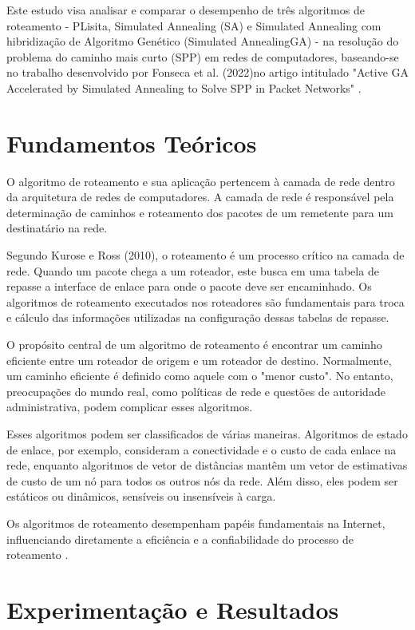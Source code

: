 \documentclass[conference]{IEEEtran}
\begin{document}
Este estudo visa analisar e comparar o desempenho de três algoritmos de roteamento - PLisita, Simulated Annealing (SA) e Simulated Annealing com hibridização de Algoritmo Genético (Simulated AnnealingGA) - na resolução do problema do caminho mais curto (SPP) em redes de computadores, baseando-se no trabalho desenvolvido por Fonseca et al. (2022)no artigo intitulado "Active GA Accelerated by Simulated Annealing to Solve SPP in Packet Networks" \cite{OL2ARouter}.

\section{Fundamentos Teóricos}

O algoritmo de roteamento e sua aplicação pertencem à camada de rede dentro da arquitetura de redes de computadores. A camada de rede é responsável pela determinação de caminhos e roteamento dos pacotes de um remetente para um destinatário na rede.

Segundo Kurose e Ross (2010), o roteamento é um processo crítico na camada de rede. Quando um pacote chega a um roteador, este busca em uma tabela de repasse a interface de enlace para onde o pacote deve ser encaminhado. Os algoritmos de roteamento executados nos roteadores são fundamentais para troca e cálculo das informações utilizadas na configuração dessas tabelas de repasse.

O propósito central de um algoritmo de roteamento é encontrar um caminho eficiente entre um roteador de origem e um roteador de destino. Normalmente, um caminho eficiente é definido como aquele com o "menor custo". No entanto, preocupações do mundo real, como políticas de rede e questões de autoridade administrativa, podem complicar esses algoritmos.

Esses algoritmos podem ser classificados de várias maneiras. Algoritmos de estado de enlace, por exemplo, consideram a conectividade e o custo de cada enlace na rede, enquanto algoritmos de vetor de distâncias mantêm um vetor de estimativas de custo de um nó para todos os outros nós da rede. Além disso, eles podem ser estáticos ou dinâmicos, sensíveis ou insensíveis à carga.

Os algoritmos de roteamento desempenham papéis fundamentais na Internet, influenciando diretamente a eficiência e a confiabilidade do processo de roteamento \cite{KuroseRoss2010}.

\section{Experimentação e Resultados}
\end{document}
